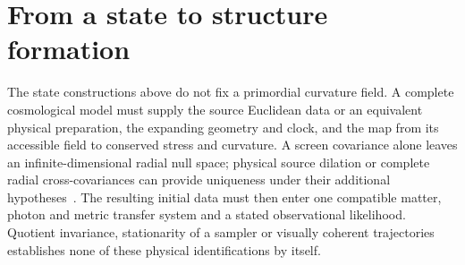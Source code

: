 \documentclass[11pt]{article}
\theoremstyle{remark}
\theoremstyle{plain}
\begin{document}
\section{From a state to structure formation}
The state constructions above do not fix a primordial curvature field.
A complete cosmological model must supply the source Euclidean data or an
equivalent physical preparation, the expanding geometry and clock, and the
map from its accessible field to conserved stress and curvature. A screen
covariance alone leaves an infinite-dimensional radial null space;
physical source dilation or complete radial cross-covariances can provide
uniqueness under their additional hypotheses~\cite{ophcmb}. The resulting
initial data must then enter one compatible matter, photon and metric
transfer system and a stated observational likelihood. Quotient invariance,
stationarity of a sampler or visually coherent trajectories establishes none
of these physical identifications by itself.
\end{document}
